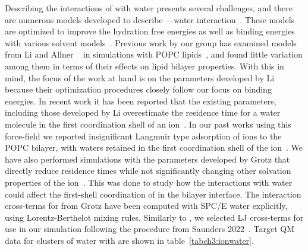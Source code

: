 Describing the interactions of \mg{} with water presents several challenges, and there are numerous
models developed to describe \mg---water interaction~\cite{merzparams,villaparams,microparams}.
These models are optimized to improve the hydration free energies as well as
binding energies with various solvent models~\cite{merzparams,villaparams,microparams}.  
Previous work by our group has examined \mg{} models
from Li \etal{} and Allner \etal{}~\cite{merzparams,villaparams} in simulations with POPC lipids~\cite{kruczek:2019}, 
and found little variation among them in terms of their effects on lipid bilayer properties. 
With this in mind, the focus of the work at hand is on the parameters developed by Li \etal{} because
their optimization procedures closely follow our focus on binding energies.
In recent work it has been reported that the existing \mg{} parameters, 
including those developed by Li \etal{}
overestimate the residence time for a water molecule in the 
first coordination shell of an ion~\cite{microparams}. 
In our past works using this force-field we reported 
insignificant Langmuir type adsorption of \mg{} ions to the POPC bilayer,
with waters retained in the first coordination shell of the ion~\cite{kruczek:2019}. 
We have also performed simulations with the parameters developed by Grotz \etal{} that directly
reduce residence times while not significantly changing other solvation 
properties of the ion~\cite{grotz:2021:optimized,microparams}. 
This was done to study how the interactions with water
could affect the first-shell coordination of \mg{} in the bilayer interface. 
The interaction cross-terms for \mg{} from Grotz \etal{} have been {computed} 
with SPC/E water explicitly, using Lorentz-Berthelot mixing rules.
Similarly to \li{}, we selected LJ cross-terms for use in our simulation following the procedure from Saunders \etal{} 2022~\cite{saunders:2022}. 
Target QM data for clusters of water with \mg{} are shown in table~\ref{tabch3:ionwater}.
